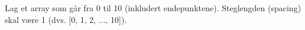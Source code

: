 %
%
Lag et array som går fra 0 til 10 (inkludert endepunktene). Steglengden (spacing) skal være 1  (dvs. [0, 1, 2, ..., 10]).

